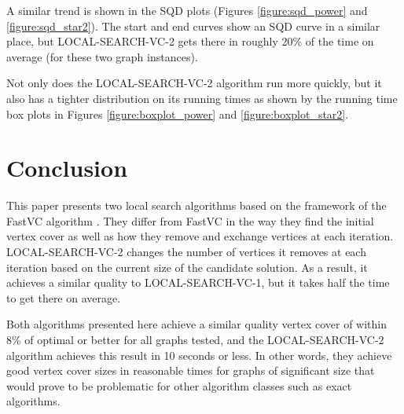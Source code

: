 \documentclass[sigconf]{acmart}
\begin{document}
A similar trend is shown in the SQD plots (Figures \ref{figure:sqd_power} and \ref{figure:sqd_star2}). The start and end curves show an SQD curve in a similar place, but LOCAL-SEARCH-VC-2 gets there in roughly 20\% of the time on average (for these two graph instances).

Not only does the LOCAL-SEARCH-VC-2 algorithm run more quickly, but it also has a tighter distribution on its running times as shown by the running time box plots in Figures \ref{figure:boxplot_power} and \ref{figure:boxplot_star2}.

\section{Conclusion}

This paper presents two local search algorithms based on the framework of the FastVC algorithm \cite{cai2015fastvc}. They differ from FastVC in the way they find the initial vertex cover as well as how they remove and exchange vertices at each iteration. LOCAL-SEARCH-VC-2 changes the number of vertices it removes at each iteration based on the current size of the candidate solution. As a result, it achieves a similar quality to LOCAL-SEARCH-VC-1, but it takes half the time to get there on average.

Both algorithms presented here achieve a similar quality vertex cover of within 8\% of optimal or better for all graphs tested, and the LOCAL-SEARCH-VC-2 algorithm achieves this result in 10 seconds or less. In other words, they achieve good vertex cover sizes in reasonable times for graphs of significant size that would prove to be problematic for other algorithm classes such as exact algorithms.


 
\end{document}
